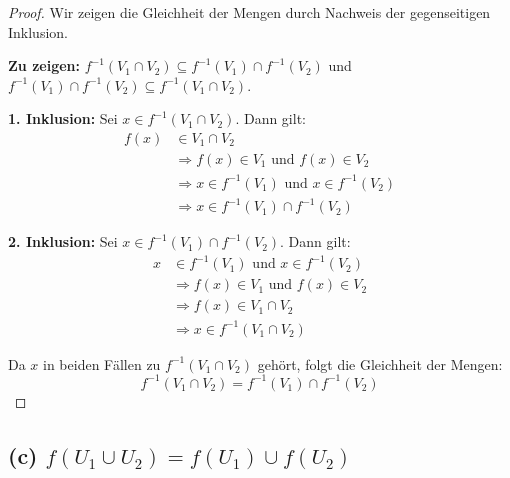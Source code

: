 \documentclass[12pt]{article}
\begin{document}
\begin{proof}
	Wir zeigen die Gleichheit der Mengen durch Nachweis der gegenseitigen Inklusion.
	
	\textbf{Zu zeigen:} \( f^{-1}(V_1 \cap V_2) \subseteq f^{-1}(V_1) \cap f^{-1}(V_2) \) und \( f^{-1}(V_1) \cap f^{-1}(V_2) \subseteq f^{-1}(V_1 \cap V_2) \).
	
	\textbf{1. Inklusion:} Sei \( x \in f^{-1}(V_1 \cap V_2) \). Dann gilt:
	\begin{align*}
		f(x) & \in V_1 \cap V_2                                             \\
		     & \Rightarrow f(x) \in V_1 \text{ und } f(x) \in V_2           \\
		     & \Rightarrow x \in f^{-1}(V_1) \text{ und } x \in f^{-1}(V_2) \\
		     & \Rightarrow x \in f^{-1}(V_1) \cap f^{-1}(V_2)
	\end{align*}
	
	\textbf{2. Inklusion:} Sei \( x \in f^{-1}(V_1) \cap f^{-1}(V_2) \). Dann gilt:
	\begin{align*}
		x & \in f^{-1}(V_1) \text{ und } x \in f^{-1}(V_2)     \\
		  & \Rightarrow f(x) \in V_1 \text{ und } f(x) \in V_2 \\
		  & \Rightarrow f(x) \in V_1 \cap V_2                  \\
		  & \Rightarrow x \in f^{-1}(V_1 \cap V_2)
	\end{align*}
	
	Da \( x \) in beiden Fällen zu \( f^{-1}(V_1 \cap V_2) \) gehört, folgt die Gleichheit der Mengen:
	\[ f^{-1}(V_1 \cap V_2) = f^{-1}(V_1) \cap f^{-1}(V_2) \]
\end{proof}

\subsection*{(c) \( f(U_1 \cup U_2) = f(U_1) \cup f(U_2) \)}
\end{document}
